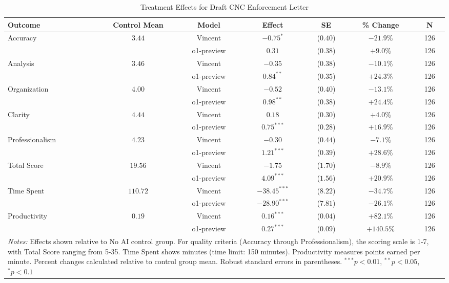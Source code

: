 \begin{table}[!htbp]
\centering
\caption{Treatment Effects for Draft CNC Enforcement Letter}
\label{tab:task6_effects}
\begin{tabular}{lcccccc}
\hline\hline
Outcome & Control Mean & Model & Effect & SE & \% Change & N \\
\hline
\multirow{2}{*}{Accuracy} & \multirow{2}{*}{$3.44$} & Vincent & $-0.75^{*}$ & ($0.40$) & $-21.9\%$ & 126 \\
& & o1-preview & $0.31$ & ($0.38$) & $+9.0\%$ & 126 \\
\hline
\multirow{2}{*}{Analysis} & \multirow{2}{*}{$3.46$} & Vincent & $-0.35$ & ($0.38$) & $-10.1\%$ & 126 \\
& & o1-preview & $0.84^{**}$ & ($0.35$) & $+24.3\%$ & 126 \\
\hline
\multirow{2}{*}{Organization} & \multirow{2}{*}{$4.00$} & Vincent & $-0.52$ & ($0.40$) & $-13.1\%$ & 126 \\
& & o1-preview & $0.98^{**}$ & ($0.38$) & $+24.4\%$ & 126 \\
\hline
\multirow{2}{*}{Clarity} & \multirow{2}{*}{$4.44$} & Vincent & $0.18$ & ($0.30$) & $+4.0\%$ & 126 \\
& & o1-preview & $0.75^{***}$ & ($0.28$) & $+16.9\%$ & 126 \\
\hline
\multirow{2}{*}{Professionalism} & \multirow{2}{*}{$4.23$} & Vincent & $-0.30$ & ($0.44$) & $-7.1\%$ & 126 \\
& & o1-preview & $1.21^{***}$ & ($0.39$) & $+28.6\%$ & 126 \\
\hline
\multirow{2}{*}{Total Score} & \multirow{2}{*}{$19.56$} & Vincent & $-1.75$ & ($1.70$) & $-8.9\%$ & 126 \\
& & o1-preview & $4.09^{***}$ & ($1.56$) & $+20.9\%$ & 126 \\
\hline
\multirow{2}{*}{Time Spent} & \multirow{2}{*}{$110.72$} & Vincent & $-38.45^{***}$ & ($8.22$) & $-34.7\%$ & 126 \\
& & o1-preview & $-28.90^{***}$ & ($7.81$) & $-26.1\%$ & 126 \\
\hline
\multirow{2}{*}{Productivity} & \multirow{2}{*}{$0.19$} & Vincent & $0.16^{***}$ & ($0.04$) & $+82.1\%$ & 126 \\
& & o1-preview & $0.27^{***}$ & ($0.09$) & $+140.5\%$ & 126 \\
\hline
\multicolumn{7}{p{0.95\linewidth}}{\footnotesize \textit{Notes:} Effects shown relative to No AI control group. For quality criteria (Accuracy through Professionalism), the scoring scale is 1-7, with Total Score ranging from 5-35. Time Spent shows minutes (time limit: 150 minutes). Productivity measures points earned per minute. Percent changes calculated relative to control group mean. Robust standard errors in parentheses. $^{***}p<0.01$, $^{**}p<0.05$, $^{*}p<0.1$}
\end{tabular}
\end{table}